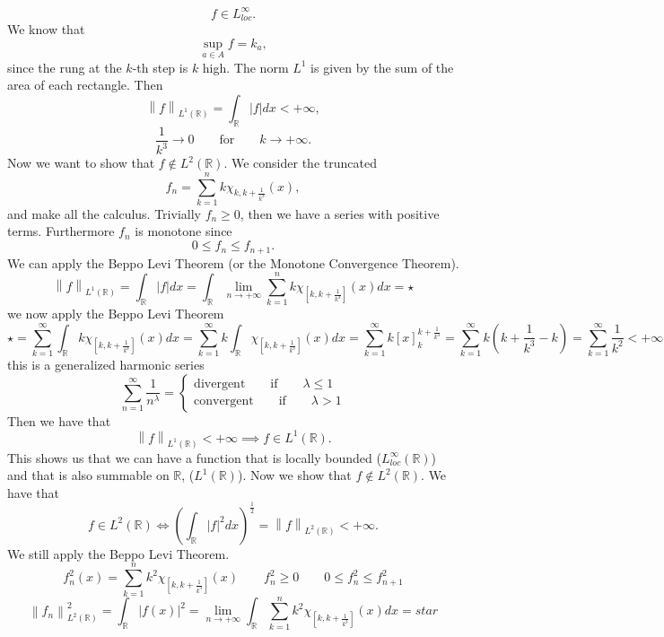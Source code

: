 \documentclass[a4paper, twoside, openany]{book}
\newcommand{\norm}[1]{\left\lVert#1\right\rVert}
\begin{document}
$$f \in L_{loc}^{\infty}.$$
\vspace{1.5 cm}
We know that
$$\sup_{a \in A} f = k_a,$$
since the  rung at the $k$-th step is $k$ high. The norm $L^1$ is given by the sum of the area of each rectangle. Then
$$\norm{f}_{L^1(\mathbb{R})} = \int_{\mathbb{R}} |f| dx < +\infty,$$
$$\frac{1}{k^3} \rightarrow 0 \qquad \textrm{for} \qquad k \rightarrow +\infty.$$
\vspace{1.5 cm}
Now we want to show that $f \notin L^2(\mathbb{R})$. We consider the truncated
$$f_n = \sum_{k = 1}^n k \chi_{k, k + \frac{1}{k^3}} (x),$$
and make all the calculus. Trivially $f_n \geq 0$, then we have a series with positive terms. Furthermore $f_n$ is monotone since
$$0 \leq f_n \leq f_{n + 1}.$$
We can apply the Beppo Levi Theorem (or the Monotone Convergence Theorem).
$$\norm{f}_{L^1(\mathbb{R})} = \int_{\mathbb{R}} |f| dx = \int_{\mathbb{R}} \lim_{n \rightarrow +\infty} \sum_{k = 1}^n k \chi_{[k, k + \frac{1}{k^3}]}(x) dx = \star$$
we now apply the Beppo Levi Theorem
$$\star = \sum_{k=1}^{\infty} \int_{\mathbb{R}} k \chi_{[k, k + \frac{1}{k^3}]}(x) dx = \sum_{k = 1}^{\infty} k \int_{\mathbb{R}} \chi_{[k, k + \frac{1}{k^3}]} (x) dx = \sum_{k=1}^{\infty} k [x]_k^{k +  \frac{1}{k^3}} = \sum_{k=1}^{\infty} k (k + \frac{1}{k^3} - k) = \sum_{k=1}^{\infty} \frac{1}{k^2} < +\infty$$
this is a generalized harmonic series
$$\sum_{n=1}^{\infty} \frac{1}{n^{\lambda}} = \begin{cases}
												\textrm{divergent} \qquad \textrm{if} \qquad \lambda \leq 1 \\
												\textrm{convergent} \qquad \textrm{if} \qquad \lambda > 1
											 \end{cases}$$
Then we have that
$$\norm{f}_{L^1(\mathbb{R})} < +\infty \implies f \in L^1(\mathbb{R}).$$			This shows us that we can have a function that is locally bounded ($L_{loc}^{\infty}(\mathbb{R})$) and that is also summable on $\mathbb{R}$, ($L^1(\mathbb{R})$).	Now we show that $f \notin L^2(\mathbb{R})$. We have that
$$f \in L^2(\mathbb{R}) \iff (\int_{\mathbb{R}} |f|^2 dx)^{\frac{1}{2}} = \norm{f}_{L^2(\mathbb{R})} < +\infty.$$
\vspace{1.5 cm}
We still apply the Beppo Levi Theorem.
$$f_n^2(x) = \sum_{k=1}^n k^2 \chi_{[k,k + \frac{1}{k^3}]} (x) \qquad f_n^2 \geq 0 \qquad 0 \leq f_n^2 \leq f_{n+1}^2$$
$$\norm{f_n}_{L^2(\mathbb{R})}^2 = \int_{\mathbb{R}} |f(x)|^2 = \lim_{n \rightarrow +\infty} \int_{\mathbb{R}} \sum_{k=1}^n k^2 \chi_{[k, k + \frac{1}{k^3}]} (x) dx = star$$
\vspace{1.5 cm}
\end{document}
